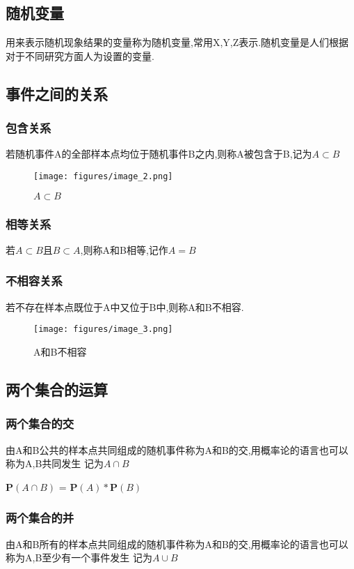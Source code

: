 \subsection{随机变量}
用来表示随机现象结果的变量称为随机变量,常用X,Y,Z表示.随机变量是人们根据对于不同研究方面人为设置的变量.
\subsection{事件之间的关系}
\subsubsection*{包含关系}
若随机事件A的全部样本点均位于随机事件B之内,则称A被包含于B,记为\(A \subset B \)
\begin{figure}[h]
    \centering
    \texttt{[image: figures/image\_2.png]}
    \caption{\(A \subset B \)}
    \label{fig:A belong to B}
\end{figure}
\subsubsection*{相等关系}
若\(A \subset B\)且\(B \subset A\),则称A和B相等,记作\(A = B\)
\subsubsection*{不相容关系}
若不存在样本点既位于A中又位于B中,则称A和B不相容.
\begin{figure}[h]
    \centering
    \texttt{[image: figures/image\_3.png]}
    \caption{A和B不相容}
    \label{1}
\end{figure}
\subsection{两个集合的运算}
\subsubsection*{两个集合的交}
由A和B公共的样本点共同组成的随机事件称为A和B的交,用概率论的语言也可以称为A,B共同发生
记为\(A \cap B \)
\begin{Theorem}[乘法原理]
    \(\mathbf{P}(A \cap B)\) = \(\mathbf{P} (A) * \mathbf{P}(B)\)
\end{Theorem}
\subsubsection*{两个集合的并}
由A和B所有的样本点共同组成的随机事件称为A和B的交,用概率论的语言也可以称为A,B至少有一个事件发生 记为\(A \cup B \)
